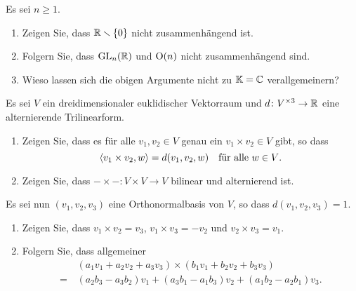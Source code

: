\documentclass[a4paper, 10pt]{scrartcl}
\begin{document}
\begin{question}
  Es sei $n \geq 1$.
  \begin{enumerate}[leftmargin=*]
    \item
      Zeigen Sie, dass $\mathbb{R} \smallsetminus \{0\}$ nicht zusammenhängend ist.
    \item
      Folgern Sie, dass $\mathrm{GL}_n(\mathbb{R})$ und $\mathrm{O}(n)$ nicht zusammenhängend sind.
    \item
      Wieso lassen sich die obigen Argumente nicht zu $\mathbb{K} = \mathbb{C}$ verallgemeinern?
  \end{enumerate}
\end{question}


\begin{question}
  Es sei $V$ ein dreidimensionaler euklidischer Vektorraum und $d \colon V^{\times 3} \to \mathbb{R}$ eine alternierende Trilinearform.
  \begin{enumerate}[leftmargin=*]
    \item
      Zeigen Sie, dass es für alle $v_1, v_2 \in V$ genau ein $v_1 \times v_2 \in V$ gibt, so dass
      \[
        \left\langle v_1 \times v_2, w \right\rangle = d(v_1, v_2, w)
        \quad
        \text{für alle $w \in V$}.
      \]
    \item
      Zeigen Sie, dass $- \times - \colon V \times V \to V$ bilinear und alternierend ist.
  \end{enumerate}
  Es sei nun $(v_1, v_2, v_3)$ eine Orthonormalbasis von $V$, so dass $d(v_1, v_2, v_3) = 1$.
  \begin{enumerate}[leftmargin=*, resume]
    \item
      Zeigen Sie, dass $v_1 \times v_2 = v_3$, $v_1 \times v_3 = -v_2$ und $v_2 \times v_3 = v_1$.
    \item
      Folgern Sie, dass allgemeiner
      \begin{align*}
         &\,  (a_1 v_1 + a_2 v_2 + a_3 v_3) \times (b_1 v_1 + b_2 v_2 + b_3 v_3)          \\
        =&\,  (a_2 b_3 - a_3 b_2) v_1 + (a_3 b_1 - a_1 b_3) v_2 + (a_1 b_2 - a_2 b_1) v_3.
      \end{align*}
  \end{enumerate}
\end{question}
\end{document}
